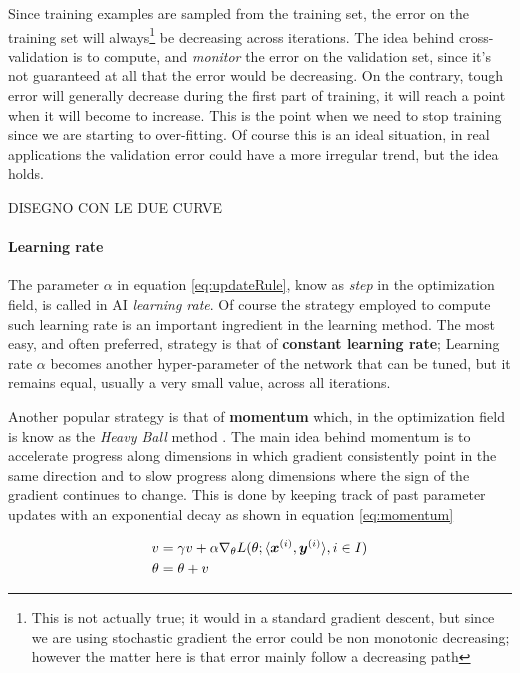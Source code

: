 Since training examples are sampled from the training set, the error on the training set will always\footnote{This is not actually true; it would in a standard gradient descent, but since we are using stochastic gradient the error could be non monotonic decreasing; however the matter here is that error mainly follow a decreasing path} be decreasing across iterations. The idea behind cross-validation is to compute, and \textit{monitor} the error on the validation set, since it's not guaranteed at all that the error would be decreasing. On the contrary, tough error will generally decrease during the first part of training, it will reach a point when it will become to increase. This is the point when we need to stop training since we are starting to over-fitting. Of course this is an ideal situation, in real applications the validation error could have a more irregular trend, but the idea holds.


DISEGNO CON LE DUE CURVE



\paragraph{Learning rate}

The parameter $\alpha$ in equation \ref{eq:updateRule}, know as \textit{step} in the optimization field, is called in AI \textit{learning rate}. Of course the strategy employed to compute such learning rate is an important ingredient in the learning method.
The most easy, and often preferred, strategy is that of \textbf{constant learning rate}; Learning rate $\alpha$ becomes another hyper-parameter of the network that can be tuned, but it remains equal, usually a very small value, across all iterations.

Another popular strategy is that of \textbf{momentum} which, in the optimization field is know as the \textit{Heavy 
Ball} method \cite{momentum}.
The main idea behind momentum is to accelerate progress along dimensions
in which gradient consistently point in the same direction
and to slow progress along dimensions where the sign
of the gradient continues to change. This is done by keeping
track of past parameter updates with an exponential decay as shown in equation \ref{eq:momentum}

\begin{align}
v &= \gamma v+ \alpha \nabla_\theta L(\theta; \langle\boldsymbol{x}^{(i)},\boldsymbol{y}^{(i)}\rangle, i\in I)\\
\theta &= \theta + v
\label{eq:momentum}
\end{align}

